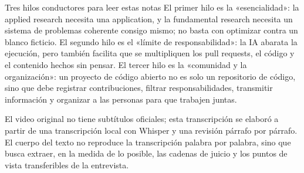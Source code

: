 \begin{importantbox}{Tres hilos conductores para leer estas notas}
El primer hilo es la «esencialidad»: la applied research necesita una application, y la fundamental research necesita un sistema de problemas coherente consigo mismo; no basta con optimizar contra un blanco ficticio. El segundo hilo es el «límite de responsabilidad»: la IA abarata la ejecución, pero también facilita que se multipliquen los pull requests, el código y el contenido hechos sin pensar. El tercer hilo es la «comunidad y la organización»: un proyecto de código abierto no es solo un repositorio de código, sino que debe registrar contribuciones, filtrar responsabilidades, transmitir información y organizar a las personas para que trabajen juntas.
\end{importantbox}

El video original no tiene subtítulos oficiales; esta transcripción se elaboró a partir de una transcripción local con Whisper y una revisión párrafo por párrafo. El cuerpo del texto no reproduce la transcripción palabra por palabra, sino que busca extraer, en la medida de lo posible, las cadenas de juicio y los puntos de vista transferibles de la entrevista.
